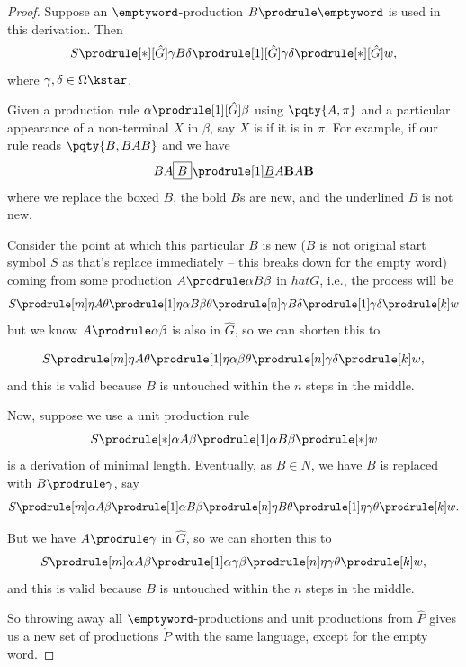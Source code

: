 \begin{proof}
    Suppose an \(\emptyword\)-production \(B \prodrule \emptyword\) is used in this derivation. Then
    \[
        S \prodrule[\ast][\hat{G}] \gamma B \delta \prodrule[1][\hat{G}] \gamma \delta \prodrule[\ast][\hat{G}] w,
    \]
    where \(\gamma, \delta \in \Omega\kstar\).

    Given a production rule \(\alpha \prodrule[1][\hat{G}] \beta\) using \(\pqty{A, \pi}\) and a particular appearance of a non-terminal \(X\) in \(\beta\), say \(X\) is  if it is in \(\pi\). For example, if our rule reads \(\pqty{B, BAB}\) and we have
    \[
        BA\boxed{B} \prodrule[1] \underline{B}A\mathbf{B}A\mathbf{B}
    \]
    where we replace the boxed \(B\), the bold \(B\)s are new, and the underlined \(B\) is not new.

    Consider the point at which this particular \(B\) is new (\(B\) is not original start symbol \(S\) as that's replace immediately -- this breaks down for the empty word) coming from some production \(A \prodrule \alpha B \beta\) in \(hat{G}\), i.e., the process will be
    \[
        S \prodrule[m] \eta A \theta \prodrule[1] \eta \alpha B \beta \theta \prodrule[n] \gamma B \delta \prodrule[1] \gamma \delta \prodrule[k] w
    \]
    but we know \(A \prodrule \alpha \beta\) is also in \(\hat{G}\), so we can shorten this to

    \[
        S \prodrule[m] \eta A \theta \prodrule[1] \eta \alpha \beta \theta \prodrule[n] \gamma\delta \prodrule[k] w,
    \]
    and this is valid because \(B\) is untouched within the \(n\) steps in the middle.

    Now, suppose we use a unit production rule
    \[
        S \prodrule[\ast] \alpha A \beta \prodrule[1] \alpha B \beta \prodrule[\ast] w
    \]
    is a derivation of minimal length. Eventually, as \(B \in N\), we have \(B\) is replaced with \(B \prodrule \gamma\), say
    \[
        S \prodrule[m] \alpha A \beta \prodrule[1] \alpha B \beta \prodrule[n] \eta B \theta \prodrule[1] \eta \gamma \theta \prodrule[k] w.
    \]

    But we have \(A \prodrule \gamma\) in \(\hat{G}\), so we can shorten this to
    \[
        S \prodrule[m] \alpha A \beta \prodrule[1] \alpha \gamma \beta \prodrule[n] \eta \gamma \theta \prodrule[k] w,
    \]
    and this is valid because \(B\) is untouched within the \(n\) steps in the middle.

    So throwing away all \(\emptyword\)-productions and unit productions from \(\hat{P}\) gives us a new set of productions \(\mathring{P}\) with the same language, except for the empty word.
\end{proof}


